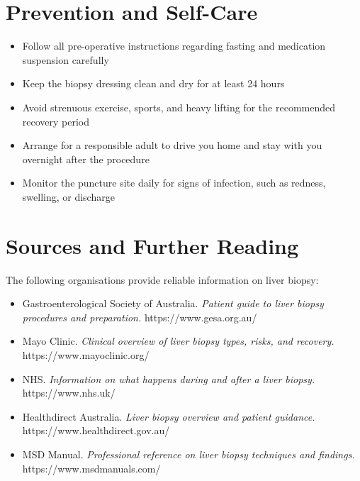 \section*{Prevention and Self-Care}
\begin{itemize}
    \item Follow all pre-operative instructions regarding fasting and medication suspension carefully
    \item Keep the biopsy dressing clean and dry for at least 24 hours
    \item Avoid strenuous exercise, sports, and heavy lifting for the recommended recovery period
    \item Arrange for a responsible adult to drive you home and stay with you overnight after the procedure
    \item Monitor the puncture site daily for signs of infection, such as redness, swelling, or discharge
\end{itemize}

\section*{Sources and Further Reading}
The following organisations provide reliable information on liver biopsy:

\begin{itemize}
    \item Gastroenterological Society of Australia. \textit{Patient guide to liver biopsy procedures and preparation.} https://www.gesa.org.au/
    \item Mayo Clinic. \textit{Clinical overview of liver biopsy types, risks, and recovery.} https://www.mayoclinic.org/
    \item NHS. \textit{Information on what happens during and after a liver biopsy.} https://www.nhs.uk/
    \item Healthdirect Australia. \textit{Liver biopsy overview and patient guidance.} https://www.healthdirect.gov.au/
    \item MSD Manual. \textit{Professional reference on liver biopsy techniques and findings.} https://www.msdmanuals.com/
\end{itemize}
